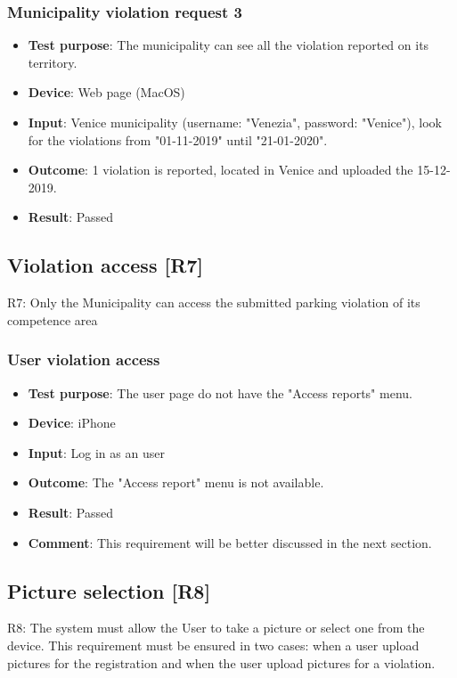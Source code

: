 \documentclass[../ATD.tex]{subfiles}
\begin{document}
    \subsubsection{Municipality violation request 3}\label{subsubsec:municiplaity-violation-request-3}
    \begin{itemize}
        \item \textbf{Test purpose}: The municipality can see all the violation reported on its territory.
        \item \textbf{Device}: Web page (MacOS)
        \item \textbf{Input}: Venice municipality (username: "Venezia", password: "Venice"), look for the violations from "01-11-2019" until "21-01-2020".
        \item \textbf{Outcome}: 1 violation is reported, located in Venice and uploaded the 15-12-2019.
        \item \textbf{Result}: Passed
    \end{itemize}

    \subsection{Violation access [R7]}\label{subsec:violation-access-1}
    R7: Only the Municipality can access the submitted parking violation of its competence area

    \subsubsection{User violation access}\label{subsubsec:user-violation-access}
    \begin{itemize}
        \item \textbf{Test purpose}: The user page do not have the "Access reports" menu.
        \item \textbf{Device}: iPhone
        \item \textbf{Input}: Log in as an user
        \item \textbf{Outcome}: The "Access report" menu is not available.
        \item \textbf{Result}: Passed
        \item \textbf{Comment}: This requirement will be better discussed in the next section.
    \end{itemize}

    \subsection{Picture selection [R8]}\label{subsec:picture-selection}
    R8: The system must allow the User to take a picture or select one from the device.
    This requirement must be ensured in two cases: when a user upload pictures for the registration and when the user upload pictures for a violation.
\end{document}
